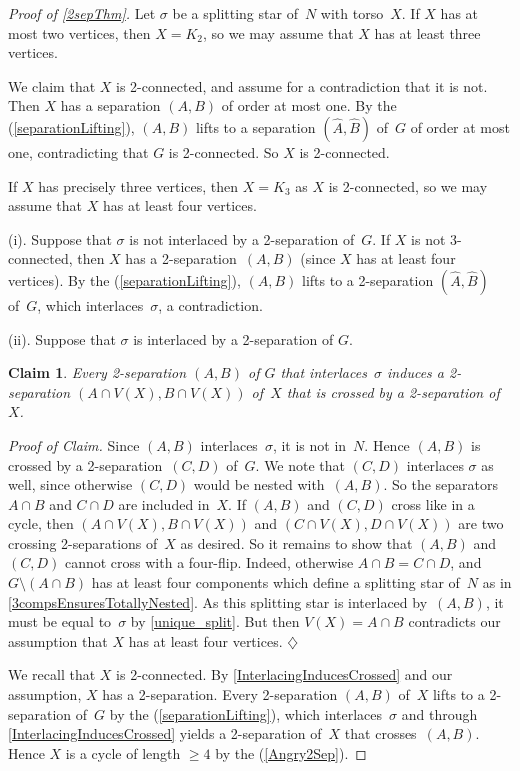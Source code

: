\documentclass{aic}
\newenvironment{cproof}{\noindent\textit{Proof of Claim.}}{\phantom{!}\!\hfill$\diamondsuit$}
\theoremstyle{plain}
\newtheorem{sublem}{Claim}[thm]
\theoremstyle{definition}
\theoremstyle{plain}
\theoremstyle{plain}
\newcommand{\sm}{\setminus}
\renewcommand{\ge}{\geqslant}
\begin{document}
\begin{proof}[Proof of \autoref{2sepThm}]
Let $\sigma$ be a splitting star of~$N$ with torso~$X$.
If $X$ has at most two vertices, then $X=K_2$, so we may assume that $X$ has at least three vertices.

We claim that $X$ is 2-connected, and assume for a contradiction that it is not.
Then $X$ has a separation $(A,B)$ of order at most one.
By the  (\ref{separationLifting}), $(A,B)$ lifts to a separation $(\hat A,\hat B)$ of~$G$ of order at most one, contradicting that $G$ is 2-connected.
So $X$ is 2-connected.

If $X$ has precisely three vertices, then $X=K_3$ as $X$ is 2-connected, so we may assume that $X$ has at least four vertices.

(i). Suppose that $\sigma$ is not interlaced by a 2-separation of~$G$.
If $X$ is not 3-connected, then $X$ has a 2-separation~$(A,B)$ (since $X$ has at least four vertices).
By the  (\ref{separationLifting}), $(A,B)$ lifts to a 2-separation $(\hat A,\hat B)$ of~$G$, which interlaces~$\sigma$, a contradiction.


(ii). Suppose that $\sigma$ is interlaced by a 2-separation of $G$.

\begin{sublem}\label{InterlacingInducesCrossed}
Every 2-separation $(A,B)$ of $G$ that interlaces~$\sigma$ induces a 2-separation $(A\cap V(X),B\cap V(X))$ of~$X$ that is crossed by a 2-separation of~$X$.
\end{sublem}
\begin{cproof}
Since $(A,B)$ interlaces~$\sigma$, it is not in~$N$.
Hence $(A,B)$ is crossed by a 2-separation~$(C,D)$ of~$G$.
We note that $(C,D)$ interlaces $\sigma$ as well, since otherwise $(C,D)$ would be nested with~$(A,B)$.
So the separators $A\cap B$ and $C\cap D$ are included in~$X$.
If $(A,B)$ and $(C,D)$ cross like in a cycle, then $(A\cap V(X),B\cap V(X))$ and $(C\cap V(X),D\cap V(X))$ are two crossing 2-separations of~$X$ as desired.
So it remains to show that $(A,B)$ and $(C,D)$ cannot cross with a four-flip.
Indeed, otherwise $A\cap B=C\cap D$, and $G\sm (A\cap B)$ has at least four components which define a splitting star of~$N$ as in \autoref{3compsEnsuresTotallyNested}.
As this splitting star is interlaced by~$(A,B)$, it must be equal to~$\sigma$ by \autoref{unique_split}.
But then $V(X)=A\cap B$ contradicts our assumption that $X$ has at least four vertices.
\end{cproof}\medskip

We recall that $X$ is 2-connected. 
By \autoref{InterlacingInducesCrossed} and our assumption, $X$ has a 2-separation.
Every 2-separation $(A,B)$ of~$X$ lifts to a 2-separation of~$G$ by the  (\ref{separationLifting}), which interlaces~$\sigma$ and through \autoref{InterlacingInducesCrossed} yields a 2-separation of~$X$ that crosses~$(A,B)$.
Hence $X$ is a cycle of length $\ge 4$ by the  (\ref{Angry2Sep}).
\end{proof}
\end{document}
